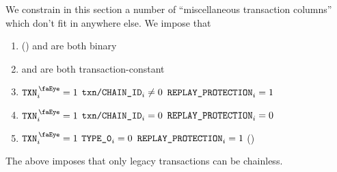 We constrain in this section a number of ``miscellaneous transaction columns'' which don't fit in anywhere else.
We impose that
\begin{enumerate}
    \item \rlpTxnCommonColumnReplayProtection{} (\sanityCheck) and \rlpTxnCommonColumnYparity{} are both binary
    \item \rlpTxnCommonColumnReplayProtection{} and \rlpTxnCommonColumnYparity{} are both transaction-constant
    \item \If $\isTxn _{i} = 1$ \et $\texttt{txn}\texttt{/}\texttt{{CHAIN\_ID}} _{i} \neq 0$ \Then $\texttt{REPLAY\_PROTECTION} _{i} = 1$
    \item \If $\isTxn _{i} = 1$ \et $\texttt{txn}\texttt{/}\texttt{{CHAIN\_ID}} _{i} =    0$ \Then $\texttt{REPLAY\_PROTECTION} _{i} = 0$
    \item \If $\isTxn _{i} = 1$ \et $\texttt{TYPE\_0}                     _{i} =    0$ \Then $\texttt{REPLAY\_PROTECTION} _{i} = 1$ \quad (\sanityCheck)
\end{enumerate}
\saNote{} \label{rlp txn v2: generalities: transaction decoding: non legacy transaction can't be chainless}
The above imposes that only legacy transactions can be chainless.
